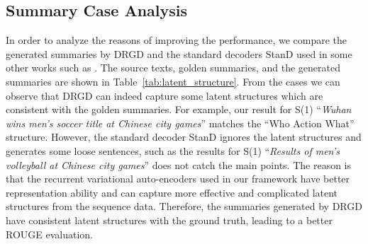 \documentclass[11pt,letterpaper]{article}
\begin{document}
\subsection{Summary Case Analysis}
In order to analyze the reasons of improving the performance, we compare the generated summaries by DRGD and the standard decoders StanD used in some other works such as \cite{chopra2016abstractive}.
The source texts, golden summaries, and the generated summaries are shown in Table~\ref{tab:latent_structure}.
From the cases we can observe that DRGD can indeed capture some latent structures which are consistent with the golden summaries. For example, our result for S(1) ``\textit{Wuhan wins men's soccer title at Chinese city games}'' matches the ``Who Action What'' structure.
However, the standard decoder StanD ignores the latent structures and generates some loose sentences, such as the results for S(1) ``\textit{Results of men's volleyball at Chinese city games}'' does not catch the main points.
The reason is that the recurrent variational auto-encoders used in our framework  have better representation ability and can capture more effective and complicated latent structures from the sequence data.
Therefore, the summaries generated by DRGD have consistent latent structures with the ground truth, leading to a better ROUGE evaluation.
\end{document}
